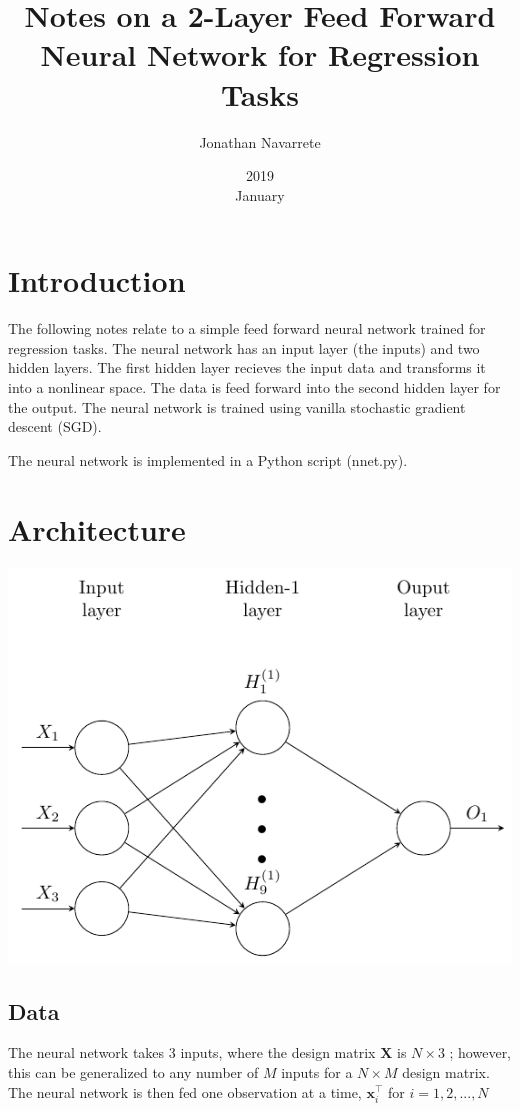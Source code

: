 \documentclass[11pt]{article}%
\title{Notes on a 2-Layer Feed Forward Neural Network for Regression Tasks}
\date{2019\\ January}
\author{Jonathan Navarrete}
\begin{document}
\maketitle

\section{Introduction}
	The following notes relate to a simple feed forward neural network trained for regression tasks. The neural network has an input layer (the inputs) and two hidden layers. The first hidden layer recieves the input data and transforms it into a nonlinear space. The data is feed forward into the second hidden layer for the output. The neural network is trained using vanilla stochastic gradient descent (SGD).
	
	The neural network is implemented in a Python script (nnet.py).
	
	
\section{Architecture}

\includegraphics{nnet.pdf}

\subsection{Data}

	The neural network takes 3 inputs, where the design matrix $\mathbf{X}$ is $N \times 3$ ; however, this can be generalized to any number of $M$ inputs for a  $N \times M$ design matrix. The neural network is then fed one observation at a time, $\mathbf{x}^\intercal_i$ for $i = 1, 2, ..., N$
	
\end{document}
